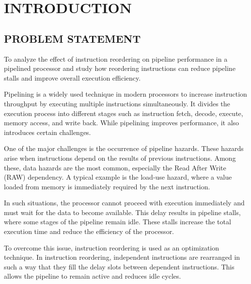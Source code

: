 \documentclass[11pt]{report}
\newcommand{\changefont}{\fontsize{9}{11}\selectfont}
\begin{document}
\newpage
\tableofcontents

\newpage
\renewcommand\thepage{\arabic{page}}

\clearpage

\setlength{\headheight}{15pt}

\pagestyle{fancy}
\fancyhf{}
\lhead{\changefont\leftmark}
\rhead{\changefont\rightmark}
\cfoot{\thepage}
\renewcommand{\chaptermark}[1]{%
\markboth{#1}{}}
\renewcommand{\sectionmark}[1]{%
\markright{#1}{}}
\renewcommand{\headrulewidth}{0.5pt}

\setcounter{page}{1}
\chapter{INTRODUCTION}
\vspace{-1 cm}

\section{PROBLEM STATEMENT}
\noindent
To analyze the effect of instruction reordering on pipeline performance in a pipelined processor and study how reordering instructions can reduce pipeline stalls and improve overall execution efficiency.

\vspace{0.3cm}
Pipelining is a widely used technique in modern processors to increase instruction throughput by executing multiple instructions simultaneously. It divides the execution process into different stages such as instruction fetch, decode, execute, memory access, and write back. While pipelining improves performance, it also introduces certain challenges.

One of the major challenges is the occurrence of pipeline hazards. These hazards arise when instructions depend on the results of previous instructions. Among these, data hazards are the most common, especially the Read After Write (RAW) dependency. A typical example is the load-use hazard, where a value loaded from memory is immediately required by the next instruction.

In such situations, the processor cannot proceed with execution immediately and must wait for the data to become available. This delay results in pipeline stalls, where some stages of the pipeline remain idle. These stalls increase the total execution time and reduce the efficiency of the processor.

To overcome this issue, instruction reordering is used as an optimization technique. In instruction reordering, independent instructions are rearranged in such a way that they fill the delay slots between dependent instructions. This allows the pipeline to remain active and reduces idle cycles.
\end{document}
